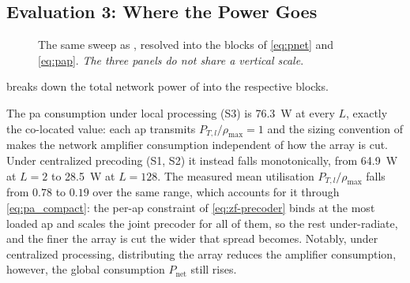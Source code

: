 
\subsection{Evaluation 3: Where the Power Goes}
\label{ssec:eval_breakdown}
\begin{figure}[t]
\centering

\caption{The same sweep as , resolved into the blocks of
\eqref{eq:pnet} and \eqref{eq:pap}. \emph{The three panels do not share a
vertical scale}.}
\label{fig:eval3}
\end{figure}

 breaks down the total network power of  into the respective blocks.

The \gls{pa} consumption under local processing (S3) is \SI{76.3}{\watt} at every $L$, exactly the co-located value: each \gls{ap} transmits $P_{T,l}/\rho_{\max}=1$ and the sizing convention of
 makes the network amplifier consumption independent of how the
array is cut. Under centralized precoding (S1, S2) it instead falls monotonically,
from \SI{64.9}{\watt} at $L=2$ to \SI{28.5}{\watt} at $L=128$. The measured mean
utilisation $P_{T,l}/\rho_{\max}$ falls from $0.78$ to $0.19$ over the same
range, which accounts for it through \eqref{eq:pa_compact}: the per-\gls{ap}
constraint of \eqref{eq:zf-precoder} binds at the most loaded \gls{ap} and
scales the joint precoder for all of them, so the rest under-radiate, and the
finer the array is cut the wider that spread becomes. Notably, under centralized processing, distributing the
array reduces the amplifier consumption, however, the global consumption $P_{\mathrm{net}}$ still rises.

